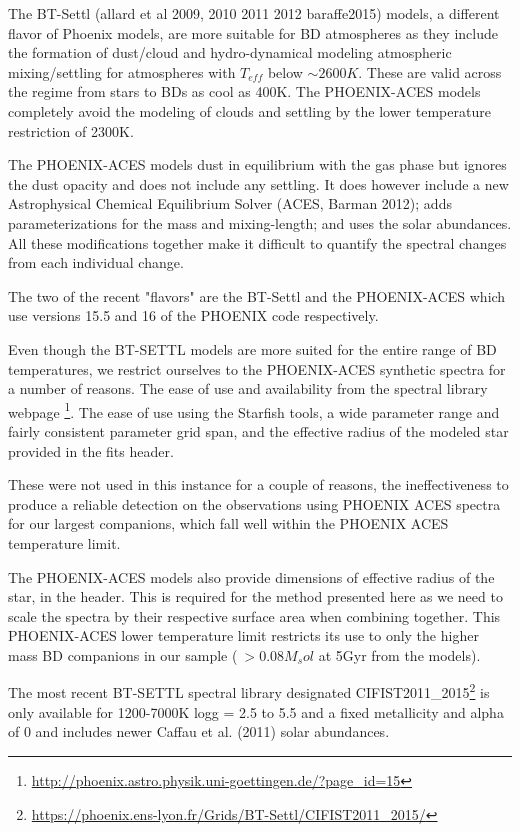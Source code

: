 \label{bt-setll}
The BT-Settl (allard et al 2009, 2010 2011 2012 baraffe2015) models, a different flavor of Phoenix models, are more suitable for BD atmospheres as they  include the formation of dust/cloud and hydro-dynamical modeling atmospheric mixing/settling for atmospheres with \(T_{eff}\) below \(\sim2600K\). These are valid across the regime from stars to BDs as cool as 400K. The PHOENIX-ACES models completely avoid the modeling of clouds and settling by the lower temperature restriction of 2300K.

The PHOENIX-ACES models dust in equilibrium with the gas phase but ignores the dust opacity and does not include any settling. It does however include a new Astrophysical Chemical Equilibrium Solver (ACES,
Barman 2012); adds parameterizations for the mass and mixing-length; and uses the \cite{asplund_chemical_2009} solar abundances. All these modifications together make it difficult to quantify the spectral changes from each individual change. 

The two of the recent "flavors" are the BT-Settl \citep{allard_model_2010, baraffe_new_2015} and the PHOENIX-ACES \citep{husser_new_2013} which use versions 15.5 and 16 of the PHOENIX code respectively.

Even though the BT-SETTL models are more suited for the entire range of BD temperatures, we restrict ourselves to the PHOENIX-ACES synthetic spectra for a number of reasons. The ease of use and availability from the spectral library webpage \footnote{\url{http://phoenix.astro.physik.uni-goettingen.de/?page_id=15}}. The ease of use using the Starfish tools, a wide parameter range and fairly consistent parameter grid span, and the effective radius of the modeled star provided in the fits header. 

These were not used in this instance for a couple of reasons, the ineffectiveness to produce a reliable detection on the observations using PHOENIX ACES spectra for our largest companions, which fall well within the PHOENIX ACES temperature limit. 

The PHOENIX-ACES models also provide dimensions of effective radius of the star, in the header. This is required for the method presented here as we need to scale the spectra by their respective surface area when combining together.
This PHOENIX-ACES lower temperature limit restricts its use to only the higher mass BD companions in our sample (\(~>0.08 M_sol\) at 5Gyr from the \cite{baraffe_evolutionary_2003} models). 


The most recent BT-SETTL spectral library designated CIFIST2011\_2015\footnote{\url{https://phoenix.ens-lyon.fr/Grids/BT-Settl/CIFIST2011_2015/}} \cite{baraffe_new_2015} is only available for 1200-7000K logg = 2.5 to 5.5 and a fixed metallicity and alpha of 0 and includes newer Caffau et al. (2011) solar abundances.

